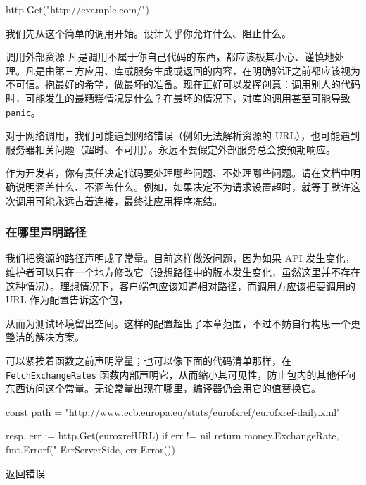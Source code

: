 \begin{gocode}[]
http.Get("http://example.com/")
\end{gocode}

我们先从这个简单的调用开始。设计关乎你允许什么、阻止什么。

\begin{infobox}{调用外部资源}
凡是调用不属于你自己代码的东西，都应该极其小心、谨慎地处理。凡是由第三方应用、库或服务生成或返回的内容，在明确验证之前都应该视为不可信。抱最好的希望，做最坏的准备。现在正好可以发挥创意：调用别人的代码时，可能发生的最糟糕情况是什么？在最坏的情况下，对库的调用甚至可能导致 \texttt{panic}。

对于网络调用，我们可能遇到网络错误（例如无法解析资源的 URL），也可能遇到服务器相关问题（超时、不可用）。永远不要假定外部服务总会按预期响应。

作为开发者，你有责任决定代码要处理哪些问题、不处理哪些问题。请在文档中明确说明涵盖什么、不涵盖什么。例如，如果决定不为请求设置超时，就等于默许这次调用可能永远占着连接，最终让应用程序冻结。
\end{infobox}

\subsubsection*{在哪里声明路径}

我们把资源的路径声明成了常量。目前这样做没问题，因为如果 API 发生变化，维护者可以只在一个地方修改它（设想路径中的版本发生变化，虽然这里并不存在这种情况）。理想情况下，客户端包应该知道相对路径，而调用方应该把要调用的 URL 作为配置告诉这个包，

从而为测试环境留出空间。这样的配置超出了本章范围，不过不妨自行构思一个更整洁的解决方案。

可以紧挨着函数之前声明常量；也可以像下面的代码清单那样，在 \texttt{FetchExchangeRates} 函数内部声明它，从而缩小其可见性，防止包内的其他任何东西访问这个常量。无论常量出现在哪里，编译器仍会用它的值替换它。

\begin{gocode}[title={代码清单 6.39 \texttt{ecb.go}：\texttt{FetchExchangeRates} 的开头几行}]
const path =
    "http://www.ecb.europa.eu/stats/eurofxref/eurofxref-daily.xml"

resp, err := http.Get(euroxrefURL)
if err != nil {
    return money.ExchangeRate{}, fmt.Errorf("%
        ErrServerSide, err.Error())
}
\end{gocode}

\begin{codeannotations}
\item 返回错误
\end{codeannotations}

